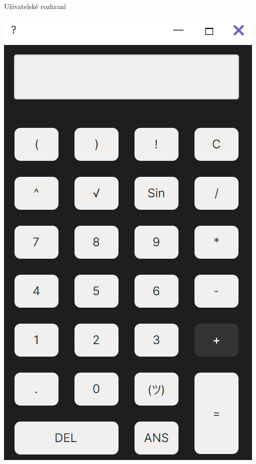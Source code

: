 \documentclass[fleqn]{beamer}
\begin{document}
\begin{frame}{Uživatelské rozhraní}
\begin{center}
\begin{minipage}[t]{0.35\linewidth}
    \includegraphics[width=0.9\linewidth]{screenshot.png}
\end{minipage}
\end{center}

\end{frame}
\end{document}
